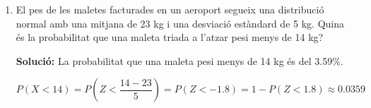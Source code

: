 \documentclass[12pt]{article}
\begin{document}
\begin{exemple}[title=]
\begin{enumerate}[start=6]
    \textbf{Solució:} La probabilitat que un participant tingui una velocitat de tipus inferior a 43 paraules per minut és del 4.46\%.
    
    \[
    P(X < 43) = P\left(Z< \frac{43 - 60}{10} \right) = P(Z< -1.7) = 1 - P(Z< 1.7) \approx 0.0446
    \]

    \item El pes de les maletes facturades en un aeroport segueix una distribució normal amb una mitjana de 23 kg i una desviació estàndard de 5 kg. Quina és la probabilitat que una maleta triada a l'atzar pesi menys de 14 kg?
    
    \textbf{Solució:} La probabilitat que una maleta pesi menys de 14 kg és del 3.59\%.
    
    \[
    P(X < 14) = P\left(Z< \frac{14 - 23}{5} \right) = P(Z< -1.8) = 1 - P(Z< 1.8) \approx 0.0359
    \]
\end{enumerate}
    
\end{exemple}
\end{document}
